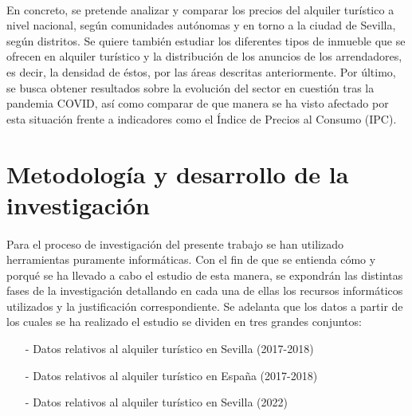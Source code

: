 \documentclass[a4paper,10pt]{article}
\begin{document}
\begin{multicols}{2}
            \paragraph*{}
            En concreto, se pretende analizar y comparar los precios del alquiler turístico a nivel nacional, según comunidades 
            autónomas y en torno a la ciudad de Sevilla, según distritos. Se quiere también estudiar los diferentes tipos de 
            inmueble que se ofrecen en alquiler turístico y la distribución de los anuncios de los arrendadores, es decir, la densidad de éstos, por las áreas 
            descritas anteriormente. Por último, se busca obtener resultados sobre la evolución del sector en cuestión tras la pandemia COVID, así como 
            comparar de que manera se ha visto afectado por esta situación frente a indicadores como el Índice de Precios al Consumo (IPC).
       
        \clearpage

        \section{Metodología y desarrollo de la investigación}

            \paragraph*{}
            Para el proceso de investigación del presente trabajo se han utilizado herramientas puramente informáticas. Con el fin de que se entienda cómo y 
            porqué se ha llevado a cabo el estudio de esta manera, se expondrán las distintas fases de la investigación detallando en cada una de ellas los recursos 
            informáticos utilizados y la justificación correspondiente. Se adelanta que los datos a partir de los cuales se ha realizado el estudio se dividen
            en tres grandes conjuntos:

            \begin{itemize}
                    
                \item[-] Datos relativos al alquiler turístico en Sevilla (2017-2018)
                \item[-] Datos relativos al alquiler turístico en España (2017-2018)
                \item[-] Datos relativos al alquiler turístico en Sevilla (2022)
            
            \end{itemize} 


\end{multicols}
\end{document}
